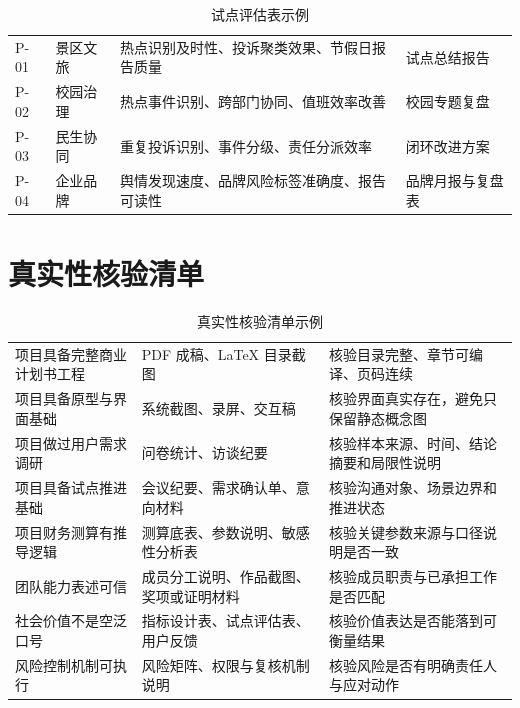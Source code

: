 \begin{table}[htbp]
	\centering
	\caption{试点评估表示例}
	\begin{tabularx}{\textwidth}{|L{1.8cm}L{2.3cm}YL{2.4cm}|}
		\hline
		 &  &         &  \\
		\hline
		P-01           & 景区文旅           & 热点识别及时性、投诉聚类效果、节假日报告质量 & 试点总结报告        \\
		P-02           & 校园治理           & 热点事件识别、跨部门协同、值班效率改善    & 校园专题复盘        \\
		P-03           & 民生协同           & 重复投诉识别、事件分级、责任分派效率     & 闭环改进方案        \\
		P-04           & 企业品牌           & 舆情发现速度、品牌风险标签准确度、报告可读性 & 品牌月报与复盘表      \\
		\hline
	\end{tabularx}
\end{table}

\section{真实性核验清单}

\begin{table}[htbp]
	\centering
	\caption{真实性核验清单示例}
	\begin{tabularx}{\textwidth}{|L{4cm}L{3cm}Y|}
		\hline
		 &     &        \\
		\hline
		项目具备完整商业计划书工程    & PDF 成稿、LaTeX 目录截图   & 核验目录完整、章节可编译、页码连续    \\
		项目具备原型与界面基础      & 系统截图、录屏、交互稿         & 核验界面真实存在，避免只保留静态概念图  \\
		项目做过用户需求调研       & 问卷统计、访谈纪要           & 核验样本来源、时间、结论摘要和局限性说明 \\
		项目具备试点推进基础       & 会议纪要、需求确认单、意向材料     & 核验沟通对象、场景边界和推进状态     \\
		项目财务测算有推导逻辑      & 测算底表、参数说明、敏感性分析表    & 核验关键参数来源与口径说明是否一致    \\
		团队能力表述可信         & 成员分工说明、作品截图、奖项或证明材料 & 核验成员职责与已承担工作是否匹配     \\
		社会价值不是空泛口号       & 指标设计表、试点评估表、用户反馈    & 核验价值表达是否能落到可衡量结果     \\
		风险控制机制可执行        & 风险矩阵、权限与复核机制说明      & 核验风险是否有明确责任人与应对动作    \\
		\hline
	\end{tabularx}
\end{table}
